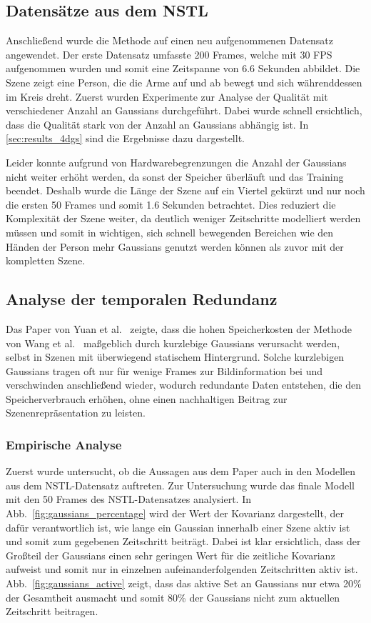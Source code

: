\subsection{Datensätze aus dem NSTL}

Anschließend wurde die Methode auf einen neu aufgenommenen Datensatz angewendet.
Der erste Datensatz umfasste 200 Frames, welche mit 30 FPS aufgenommen wurden und somit eine Zeitspanne von 6.6 Sekunden abbildet.
Die Szene zeigt eine Person, die die Arme auf und ab bewegt und sich währenddessen im Kreis dreht. 
Zuerst wurden Experimente zur Analyse der Qualität mit verschiedener Anzahl an Gaussians durchgeführt. 
Dabei wurde schnell ersichtlich, dass die Qualität stark von der Anzahl an Gaussians abhängig ist.
In \ref{sec:results_4dgs} sind die Ergebnisse dazu dargestellt.

Leider konnte aufgrund von Hardwarebegrenzungen die Anzahl der Gaussians nicht weiter erhöht werden, da sonst der Speicher überläuft und das Training beendet.
Deshalb wurde die Länge der Szene auf ein Viertel gekürzt und nur noch die ersten 50 Frames und somit 1.6 Sekunden betrachtet.
Dies reduziert die Komplexität der Szene weiter, da deutlich weniger Zeitschritte modelliert werden müssen und somit in wichtigen, sich schnell bewegenden Bereichen wie den Händen der Person mehr Gaussians genutzt werden können als zuvor mit der kompletten Szene.



\subsection{Analyse der temporalen Redundanz}

Das Paper von Yuan et al.~\cite{yuan20251000fps4dgaussian} zeigte, dass die hohen Speicherkosten der Methode von Wang et al.~\cite{wang20234dgs} maßgeblich durch kurzlebige Gaussians verursacht werden, selbst in Szenen mit überwiegend statischem Hintergrund. 
Solche kurzlebigen Gaussians tragen oft nur für wenige Frames zur Bildinformation bei und verschwinden anschließend wieder, wodurch redundante Daten entstehen, die den Speicherverbrauch erhöhen, ohne einen nachhaltigen Beitrag zur Szenenrepräsentation zu leisten.  

\subsubsection{Empirische Analyse}  
Zuerst wurde untersucht, ob die Aussagen aus dem Paper auch in den Modellen aus dem NSTL-Datensatz auftreten.
Zur Untersuchung wurde das finale Modell mit den 50 Frames des NSTL-Datensatzes analysiert.  
In Abb.~\ref{fig:gaussians_percentage} wird der Wert der Kovarianz dargestellt, der dafür verantwortlich ist, wie lange ein Gaussian innerhalb einer Szene aktiv ist und somit zum gegebenen Zeitschritt beiträgt.
Dabei ist klar ersichtlich, dass der Großteil der Gaussians einen sehr geringen Wert für die zeitliche Kovarianz aufweist und somit nur in einzelnen aufeinanderfolgenden Zeitschritten aktiv ist. 
Abb.~\ref{fig:gaussians_active} zeigt, dass das aktive Set an Gaussians nur etwa 20\% der Gesamtheit ausmacht und somit 80\% der Gaussians nicht zum aktuellen Zeitschritt beitragen.

